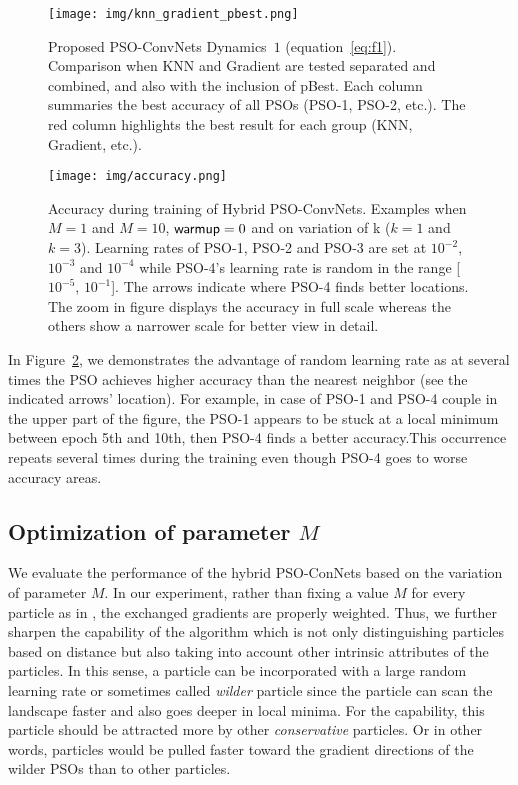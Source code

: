 \documentclass{ieeeaccess}
\begin{document}
\begin{figure*}[htb!]
\begin{center}
\texttt{[image: img/knn\_gradient\_pbest.png]}
\caption{Proposed PSO-ConvNets Dynamics~$1$ (equation~\ref{eq:f1}). Comparison when KNN and Gradient are tested separated and combined, and also with the inclusion of pBest. Each column summaries the best accuracy of all PSOs (PSO-1, PSO-2, etc.). The red column highlights the best result for each group (KNN, Gradient, etc.).}
\label{fig:knn_gradient_pbest}
\end{center}
\end{figure*}
\begin{figure}[htb!]
\begin{center}
\texttt{[image: img/accuracy.png]}
\caption{Accuracy during training of Hybrid PSO-ConvNets. Examples when $M=1$ and $M=10$, ${\sf warmup}=0$ and on variation of k ($k=1$ and $k=3$). Learning rates of PSO-1, PSO-2 and PSO-3 are set at $10^{-2}$, $10^{-3}$ and $10^{-4}$ while PSO-4's learning rate is random in the range [$10^{-5}$, $10^{-1}$]. The arrows indicate where PSO-4 finds better locations. The zoom in figure displays the accuracy in full scale whereas the others show a narrower scale for better view in detail.}
\label{fig:accuracy}
\end{center}
\end{figure}


In Figure~\ref{fig:accuracy}, we demonstrates the advantage of random learning rate as at several times the PSO achieves higher accuracy than the nearest neighbor (see the indicated arrows' location). For example, in case of PSO-1 and PSO-4 couple in the upper part of the figure, the PSO-1 appears to be stuck at a local minimum between epoch 5th and 10th, then PSO-4 finds a better accuracy.This occurrence repeats several times during the training even though PSO-4 goes to worse accuracy areas. 
\subsection{Optimization of parameter $M$}
\label{sec:M}
We evaluate the performance of the hybrid PSO-ConNets based on the variation of parameter $M$. In our experiment, rather than fixing a value $M$ for every particle as in \cite{cucker2007emergent}, the exchanged gradients are properly weighted. Thus, we further sharpen the capability of the algorithm which is not only distinguishing particles based on distance but also taking into account other intrinsic attributes of the particles. In this sense, a particle can be incorporated with a large random learning rate or sometimes called \textit{wilder} particle since the particle can scan the landscape faster and also goes deeper in local minima. For the capability, this particle should be attracted more by other \textit{conservative} particles. Or in other words, particles would be pulled faster toward the gradient directions of the wilder PSOs than to other particles.
\end{document}
